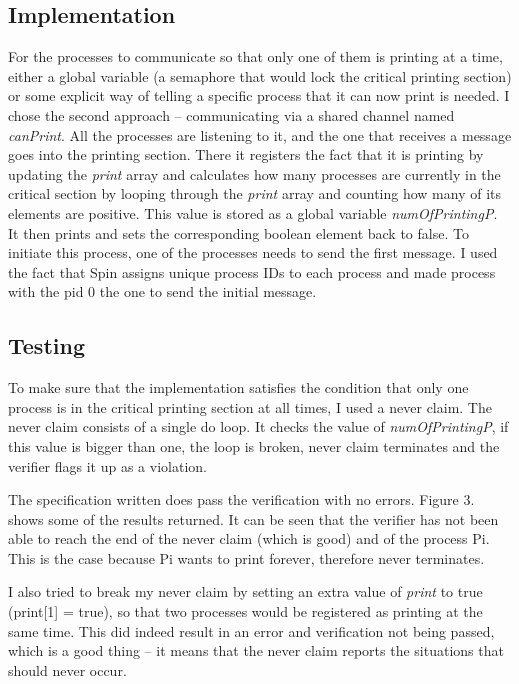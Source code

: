\documentclass{report}
\newcommand{\tab}{\hspace*{3em}}
\begin{document}
\subsection*{Implementation}
\tab For the processes to communicate so that only one of them is printing at a time, either a global variable (a semaphore that would lock the critical printing section) or some explicit way of telling a specific process that it can now print is needed. I chose the second approach -- communicating via a shared channel named \textit{canPrint}. All the processes are listening to it, and the one that receives a message goes into the printing section. There it registers the fact that it is printing by updating the \textit{print} array and calculates how many processes are currently in the critical section by looping through the \textit{print} array and counting how many of its elements are positive. This value is stored as a global variable \textit{numOfPrintingP}. It then prints and sets the corresponding boolean element back to false. To initiate this process, one of the processes needs to send the first message. I used the fact that Spin assigns unique process IDs to each process and made process with the pid 0 the one to send the initial message.

\subsection*{Testing}
\tab To make sure that the implementation satisfies the condition that only one process is in the critical printing section at all times, I used a never claim. The never claim consists of a single do loop. It checks the value of \textit{numOfPrintingP}, if this value is bigger than one, the loop is broken, never claim terminates and the verifier flags it up as a violation.
\par The specification written does pass the verification with no errors. Figure 3. shows some of the results returned. It can be seen that the verifier has not been able to reach the end of the never claim (which is good) and of the process Pi. This is the case because Pi wants to print forever, therefore never terminates.
\par I also tried to break my never claim by setting an extra value of \textit{print} to true (print[1] = true), so that two processes would be registered as printing at the same time. This did indeed result in an error and verification not being passed, which is a good thing -- it means that the never claim reports the situations that should never occur.
\end{document}
